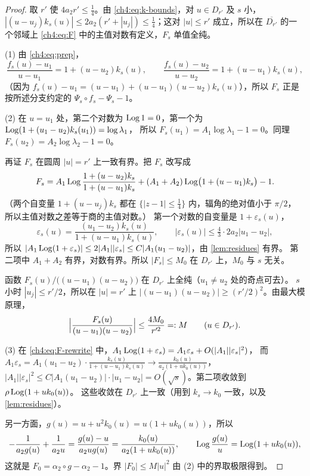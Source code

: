 \begin{proof}
取 $r'$ 使 $4a_2r'\le\frac14$。由 \eqref{ch4:eq:k-bounds}，对 $u\in D_{r'}$ 及 $s$ 小，
$|(u-u_j)k_s(u)|\le2a_2(r'+|u_j|)\le\frac14$；这对 $|u|\le r'$ 成立，所以在 $\overline{D_{r'}}$ 的一个邻域上 \eqref{ch4:eq:F} 中的主值对数有定义，$F_s$ 单值全纯。

(1) 由 \eqref{ch4:eq:prep}，
\begin{equation}\label{ch4:eq:ratios}
 \frac{f_s(u)-u_1}{u-u_1}=1+(u-u_2)k_s(u),\qquad \frac{f_s(u)-u_2}{u-u_2}=1+(u-u_1)k_s(u),
\end{equation}
（因为 $f_s(u)-u_1=(u-u_1)+(u-u_1)(u-u_2)k_s(u)$），所以 $F_s$ 正是按所述分支约定的 $\Psi_s\circ f_s-\Psi_s-1$。

(2) 在 $u=u_1$ 处，第二个对数为 $\operatorname{Log}1=0$，第一个为 $\operatorname{Log}(1+(u_1-u_2)k_s(u_1))=\log\lambda_1$，
所以 $F_s(u_1)=A_1\log\lambda_1-1=0$。同理 $F_s(u_2)=A_2\log\lambda_2-1=0$。

再证 $F_s$ 在圆周 $|u|=r'$ 上一致有界。把 $F_s$ 改写成
\begin{equation}\label{ch4:eq:F-rewrite}
 F_s=A_1\operatorname{Log}\frac{1+(u-u_2)k_s}{1+(u-u_1)k_s}+(A_1+A_2)\operatorname{Log}\bigl(1+(u-u_1)k_s\bigr)-1 .
\end{equation}
（两个自变量 $1+(u-u_j)k_s$ 都在 $\{|z-1|\le\frac14\}$ 内，辐角的绝对值小于 $\pi/2$，
所以主值对数之差等于商的主值对数。）
第一个对数的自变量是 $1+\varepsilon_s(u)$，
\[
 \varepsilon_s(u)=\frac{(u_1-u_2)k_s(u)}{1+(u-u_1)k_s(u)},\qquad |\varepsilon_s(u)|\le\tfrac43\cdot2a_2|u_1-u_2| ,
\]
所以 $|A_1\operatorname{Log}(1+\varepsilon_s)|\le2|A_1||\varepsilon_s|\le C|A_1(u_1-u_2)|$，由 \cref{lem:residues} 有界。
第二项中 $A_1+A_2$ 有界，对数有界。所以 $|F_s|\le M_0$ 在 $D_{r'}$ 上，$M_0$ 与 $s$ 无关。

函数 $F_s(u)/\bigl((u-u_1)(u-u_2)\bigr)$ 在 $D_{r'}$ 上全纯（$u_1\ne u_2$ 处的奇点可去）。
$s$ 小时 $|u_j|\le r'/2$，所以在 $|u|=r'$ 上 $|(u-u_1)(u-u_2)|\ge(r'/2)^2$。由最大模原理，
\[
 \Bigl|\frac{F_s(u)}{(u-u_1)(u-u_2)}\Bigr|\le\frac{4M_0}{r'^2}=:M\qquad(u\in D_{r'}).
\]

(3) 在 \eqref{ch4:eq:F-rewrite} 中，$A_1\operatorname{Log}(1+\varepsilon_s)=A_1\varepsilon_s+O(|A_1||\varepsilon_s|^2)$，
而 $A_1\varepsilon_s=A_1(u_1-u_2)\cdot\frac{k_s(u)}{1+(u-u_1)k_s(u)}\to\frac{k_0(u)}{a_2(1+uk_0(u))}$，
$|A_1||\varepsilon_s|^2\le C|A_1(u_1-u_2)|\cdot|u_1-u_2|=O(\sqrt s)$。第二项收敛到 $\rho\operatorname{Log}(1+uk_0(u))$。
这些收敛在 $D_{r'}$ 上一致（用到 $k_s\to k_0$ 一致，以及 \cref{lem:residues}）。

另一方面，$g(u)=u+u^2k_0(u)=u(1+uk_0(u))$，所以
\[
 -\frac1{a_2g(u)}+\frac1{a_2u}=\frac{g(u)-u}{a_2ug(u)}=\frac{k_0(u)}{a_2(1+uk_0(u))},\qquad
 \operatorname{Log}\frac{g(u)}u=\operatorname{Log}(1+uk_0(u)),
\]
这就是 $F_0=\alpha_2\circ g-\alpha_2-1$。界 $|F_0|\le M|u|^2$ 由 (2) 中的界取极限得到。
\end{proof}

